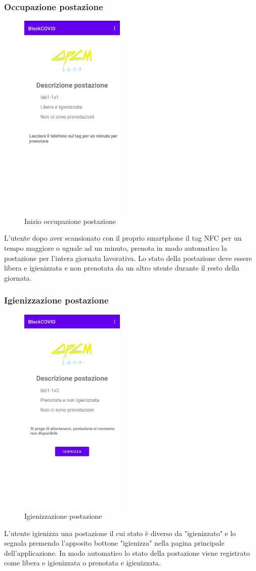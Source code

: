 \subsubsection{Occupazione postazione}
\begin{figure}[H]
	\centering
	\includegraphics[width=5cm]{res/images/DescrizionePostazione1.png}
	\caption{Inizio occupazione postazione}
\end{figure}
L'utente dopo aver scansionato con il proprio smartphone il tag NFC per
un tempo maggiore o uguale ad un minuto, prenota in modo automatico la postazione per
l’intera giornata lavorativa. Lo stato della postazione deve essere libera e igienizzata e non prenotata da un altro utente durante il resto della giornata.
\subsubsection{Igienizzazione postazione}
\begin{figure}[H]
	\centering
	\includegraphics[width=5cm]{res/images/DescrizionePostazione3.png}
	\caption{Igienizzazione postazione}
\end{figure}
L'utente igienizza una postazione il cui stato è diverso da "igienizzato" e lo segnala premendo l'apposito bottone "igienizza" nella pagina principale dell'applicazione. In modo automatico lo stato della postazione viene registrato come libera e igienizzata o prenotata e igienizzata.
